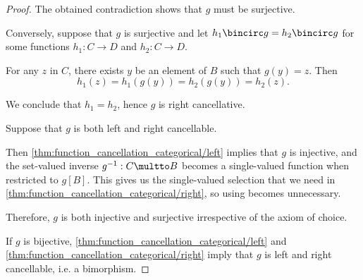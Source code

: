 \begin{proof}
  The obtained contradiction shows that \( g \) must be surjective.

  \NecessitySubProof* Conversely, suppose that \( g \) is surjective and let \( h_1 \bincirc g = h_2 \bincirc g \) for some functions \( h_1: C \to D \) and \( h_2: C \to D \).

  For any \( z \) in \( C \), there exists \( y \) be an element of \( B \) such that \( g(y) = z \). Then
  \begin{equation*}
    h_1(z) = h_1(g(y)) = h_2(g(y)) = h_2(z).
  \end{equation*}

  We conclude that \( h_1 = h_2 \), hence \( g \) is right cancellative.


  \SufficiencySubProof* Suppose that \( g \) is both left and right cancellable.

  Then \cref{thm:function_cancellation_categorical/left} implies that \( g \) is injective, and the set-valued inverse \( g^{-1}: C \multto B \) becomes a single-valued function when restricted to \( g[B] \). This gives us the single-valued selection that we need in \cref{thm:function_cancellation_categorical/right}, so using  becomes unnecessary.

  Therefore, \( g \) is both injective and surjective irrespective of the axiom of choice.

  \NecessitySubProof* If \( g \) is bijective, \cref{thm:function_cancellation_categorical/left} and \cref{thm:function_cancellation_categorical/right} imply that \( g \) is left and right cancellable, i.e. a bimorphism.
\end{proof}

